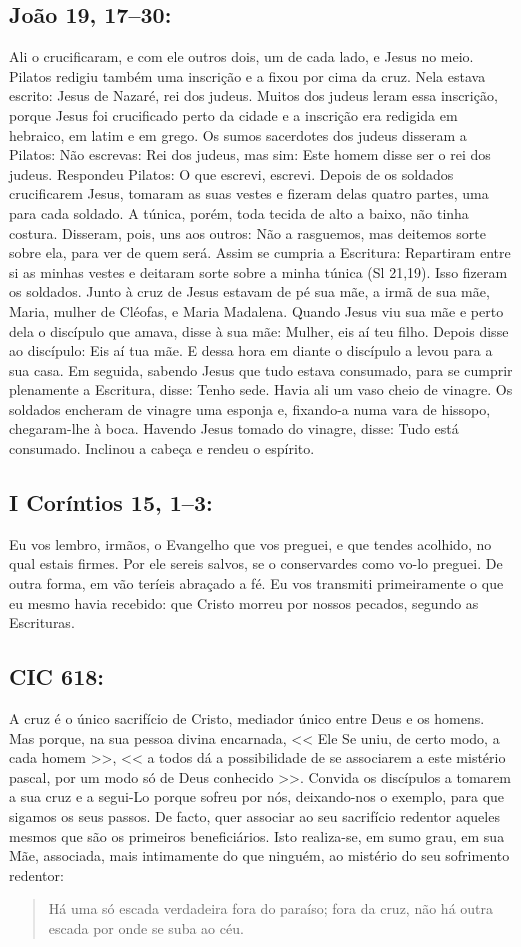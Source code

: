 \documentclass[10pt,a5paper]{book}
\newcommand{\from}[1]{\subsection*{#1}}
\begin{document}
\from{João 19, 17--30:}

Ali o crucificaram, e com ele outros dois, um de cada lado, e Jesus no meio.
Pilatos redigiu também uma inscrição e a fixou por cima da cruz.
Nela estava escrito:
Jesus de Nazaré, rei dos judeus.
Muitos dos judeus leram essa inscrição, porque Jesus foi crucificado perto da cidade e a inscrição era redigida em hebraico, em latim e em grego.
Os sumos sacerdotes dos judeus disseram a Pilatos:
Não escrevas:
Rei dos judeus, mas sim:
Este homem disse ser o rei dos judeus.
Respondeu Pilatos:
O que escrevi, escrevi.
Depois de os soldados crucificarem Jesus, tomaram as suas vestes e fizeram delas quatro partes, uma para cada soldado.
A túnica, porém, toda tecida de alto a baixo, não tinha costura.
Disseram, pois, uns aos outros:
Não a rasguemos, mas deitemos sorte sobre ela, para ver de quem será.
Assim se cumpria a Escritura:
Repartiram entre si as minhas vestes e deitaram sorte sobre a minha túnica (Sl 21,19).
Isso fizeram os soldados.
Junto à cruz de Jesus estavam de pé sua mãe, a irmã de sua mãe, Maria, mulher de Cléofas, e Maria Madalena.
Quando Jesus viu sua mãe e perto dela o discípulo que amava, disse à sua mãe:
Mulher, eis aí teu filho.
Depois disse ao discípulo:
Eis aí tua mãe.
E dessa hora em diante o discípulo a levou para a sua casa.
Em seguida, sabendo Jesus que tudo estava consumado, para se cumprir plenamente a Escritura, disse:
Tenho sede.
Havia ali um vaso cheio de vinagre.
Os soldados encheram de vinagre uma esponja e, fixando-a numa vara de hissopo, chegaram-lhe à boca.
Havendo Jesus tomado do vinagre, disse:
Tudo está consumado.
Inclinou a cabeça e rendeu o espírito.

\from{I Coríntios 15, 1--3:}

Eu vos lembro, irmãos, o Evangelho que vos preguei, e que tendes acolhido, no qual estais firmes.
Por ele sereis salvos, se o conservardes como vo-lo preguei.
De outra forma, em vão teríeis abraçado a fé.
Eu vos transmiti primeiramente o que eu mesmo havia recebido:
que Cristo morreu por nossos pecados, segundo as Escrituras.

\from{CIC 618:}

A cruz é o único sacrifício de Cristo, mediador único entre Deus e os homens.
Mas porque, na sua pessoa divina encarnada,
<< Ele Se uniu, de certo modo, a cada homem >>, << a todos dá a possibilidade de se associarem a este mistério pascal, por um modo só de Deus conhecido >>.
Convida os discípulos a tomarem a sua cruz e a segui-Lo porque sofreu por nós, deixando-nos o exemplo, para que sigamos os seus passos.
De facto, quer associar ao seu sacrifício redentor aqueles mesmos que são os primeiros beneficiários.
Isto realiza-se, em sumo grau, em sua Mãe, associada, mais intimamente do que ninguém, ao mistério do seu sofrimento redentor:
\begin{quote}
Há uma só escada verdadeira fora do paraíso;
fora da cruz, não há outra escada por onde se suba ao céu.
\end{quote}
\end{document}
